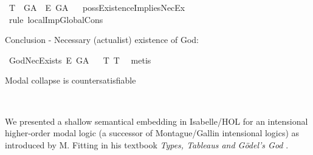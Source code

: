 \begin{isabellebody}
\ T{}{\isacharcolon}\ {\isachardoublequoteopen}{\isasymlfloor}\isactrlbold {\isasymdiamond}\isactrlbold {\isasymexists}\ G\isactrlsup A{\isasymrfloor}\ {\isasymlongrightarrow}\ {\isasymlfloor}\isactrlbold {\isasymbox}\isactrlbold {\isasymexists}\isactrlsup E\ G\isactrlsup A{\isasymrfloor}{\isachardoublequoteclose}%
\isadelimproof
\ %
\endisadelimproof
%
\isatagproof
{}\isamarkupfalse%
\ possExistenceImpliesNecEx\ \isanewline
\ \ \ \ \isamarkupfalse%
\ {\isacharparenleft}rule\ localImpGlobalCons{\isacharparenright}\ %
%
\endisatagproof
{\isafoldproof}%
%
\isadelimproof
%
\endisadelimproof
%
\begin{isamarkuptext}%
Conclusion - Necessary (actualist) existence of God:%
\end{isamarkuptext}\isamarkuptrue%
\isamarkupfalse%
\ GodNecExists{\isacharcolon}\ {\isachardoublequoteopen}{\isasymlfloor}\isactrlbold {\isasymbox}\isactrlbold {\isasymexists}\isactrlsup E\ G\isactrlsup A{\isasymrfloor}{\isachardoublequoteclose}%
\isadelimproof
\ %
\endisadelimproof
%
\isatagproof
{}\isamarkupfalse%
\ T{}\ T{}\ \isamarkupfalse%
\ metis%
\endisatagproof
{\isafoldproof}%
%
\isadelimproof
%
\endisadelimproof
%
\isamarkuptrue%
%
\begin{isamarkuptext}%
Modal collapse is countersatisfiable%
\end{isamarkuptext}\isamarkuptrue%
\isamarkupfalse%
\ {\isachardoublequoteopen}{\isasymlfloor}\isactrlbold {\isasymforall}{\isasymPhi}{\isachardot}{\isacharparenleft}{\isasymPhi}\ \isactrlbold {\isasymrightarrow}\ {\isacharparenleft}\isactrlbold {\isasymbox}\ {\isasymPhi}{\isacharparenright}{\isacharparenright}{\isasymrfloor}{\isachardoublequoteclose}\ \isamarkupfalse%
%
\isadelimproof
\ %
\endisadelimproof
%
\isatagproof
{}\isamarkupfalse%
%
\endisatagproof
{\isafoldproof}%
%
\isadelimproof
%
\endisadelimproof
%
\begin{isamarkuptext}%
\pagebreak%
\end{isamarkuptext}\isamarkuptrue%
%
\isamarkuptrue%
%
\begin{isamarkuptext}%
We presented a shallow semantical embedding in Isabelle/HOL for an intensional higher-order modal logic
(a successor of Montague/Gallin intensional logics) as introduced by M. Fitting in his textbook \emph{Types, Tableaus and 
G\"odel's God} \cite{Fitting}. 

\end{isamarkuptext}
\end{isabellebody}
